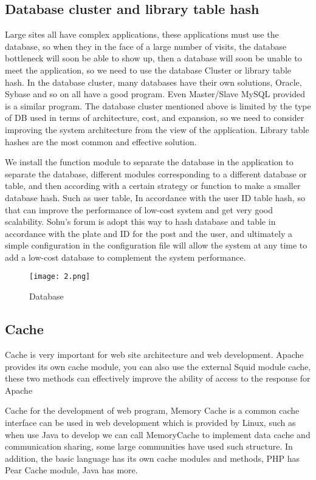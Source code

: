 \documentclass[a4paper]{article}
\begin{document}
\subsection{Database cluster and library table hash}
Large sites all have complex applications, these applications must use the database, so when they in the face of a large number of visits, the database bottleneck will soon be able to show up, then a database will soon be unable to meet the application, so we need to use the database Cluster or library table hash. In the database cluster, many databases have their own solutions, Oracle, Sybase and so on all have a good program. Even Master/Slave MySQL provided is a similar program. The database cluster mentioned above is limited by the type of DB used in terms of architecture, cost, and expansion, so we need to consider improving the system architecture from the view of the application. Library table hashes are the most common and effective solution.

We install the function module to separate the database in the application to separate the database, different modules corresponding to a different database or table, and then according  with a certain strategy or function to make a smaller database hash. Such as user table, In accordance with the user ID table hash, so that can improve the performance of low-cost system and get very good scalability. Sohu's forum is adopt this way to hash database and table in accordance with the plate and ID for the post and the user, and ultimately a simple configuration in the configuration file will allow the system at any time to add a low-cost database to complement the system performance.

\begin{figure}[htbp]
\centering
\texttt{[image: 2.png]}
%
\caption{Database}\label{fig:digi}
\end{figure}


\subsection{Cache}
Cache is very important for web site architecture and web development. Apache provides its own cache module, you can also use the external Squid module cache, these two methods can effectively improve the ability of access to the response for Apache

Cache for the development of web program, Memory Cache is a common cache interface can be used in web development which is provided by Linux, such as when use Java to develop we can call MemoryCache to implement data cache and communication sharing, some large communities have used such structure. In addition, the basic language has its own cache modules and methods, PHP has Pear Cache module, Java has more.
\end{document}

